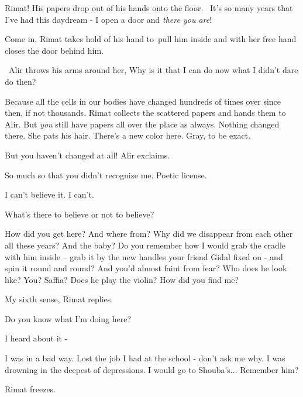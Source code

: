 \documentclass[letterpaper]{article}
\begin{document}
{\textquotedbl}Rimat!{\textquotedbl} His papers drop out of his hands onto the floor.~ {\textquotedbl}It's so many years
that I've had this daydream - I open a door and \textit{there you are}!{\textquotedbl}

{\textquotedbl}Come in,{\textquotedbl} Rimat takes hold of his hand to~pull him inside and with her free hand closes the
door behind him. 

~Alir throws his arms around her, {\textquotedbl}Why is it that I can do now what I didn't dare do then?{\textquotedbl}

{\textquotedbl}Because all the cells in our bodies have changed hundreds of times over since then, if not
thousands.{\textquotedbl} Rimat collects the scattered papers and hands them to Alir. {\textquotedbl}But \textit{you}
still have papers all over the place as always. Nothing changed there.{\textquotedbl} She pats his hair.
{\textquotedbl}There's a new color here. Gray, to be exact.{\textquotedbl} 

{\textquotedbl}But you haven't changed at all!{\textquotedbl} Alir exclaims.

{\textquotedbl}So much so that you didn't recognize me. Poetic license.{\textquotedbl} 

{\textquotedbl}I can't believe it. I can't.{\textquotedbl} 

{\textquotedbl}What's there to believe or not to believe?{\textquotedbl} 

{\textquotedbl}How did you get here? And where from? Why did we disappear from each other all these years? And the baby?
Do you remember how I would grab the cradle with him inside -- grab it by the new handles your friend Gidal
fixed\textcolor[rgb]{0.8901961,0.42352942,0.039215688}{ }on\textcolor[rgb]{0.8901961,0.42352942,0.039215688}{ }{}- and
spin it round and round? And you'd almost faint from fear? Who does he look like? You? Saffia? Does he play the violin?
How did you find me?{\textquotedbl} 

{\textquotedbl}My sixth sense,{\textquotedbl} Rimat replies. 

{\textquotedbl}Do you know what I'm doing here?{\textquotedbl} 

{\textquotedbl}I heard about it -{\textquotedbl}

{\textquotedbl}I was in a bad way. Lost the job I had at the school - don't ask me why. I was drowning in the deepest of
depressions. I would go to Shouba's... Remember him?{\textquotedbl}

Rimat freezes.
\end{document}
